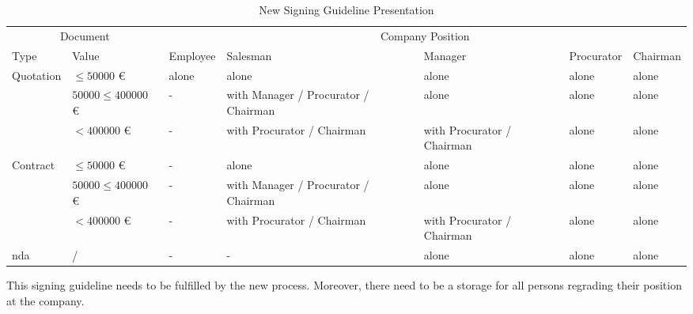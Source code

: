 \begin{table}[h!]
	\begin{tabular}{|p{1.5cm}|p{2cm}|p{2cm}|p{2cm}|p{2cm}|p{2cm}|p{2cm}|} \hline
		\multicolumn{2}{|c|}{Document} & \multicolumn{5}{c|}{Company Position}\\ 
		Type & Value & Employee & Salesman & Manager & Procurator & Chairman \\ \hline
		\multirow{3}{1.5cm}{Quotation} & $ \leq 50 000 $ \euro & alone & alone & alone & alone & alone \\ \cline{2-7}
							 & $ 50 000 \leq 400 000 $ \euro & - & with Manager / Procurator / Chairman & alone & alone & alone \\ \cline{2-7}
							 & $ < 400 000 $ \euro & - & with Procurator / Chairman & with Procurator / Chairman & alone & alone \\ \hline
		\multirow{3}{1.5cm}{Contract} & $ \leq 50 000 $ \euro & - & alone & alone & alone & alone \\ \cline{2-7}
									& $ 50 000 \leq 400 000 $ \euro & - & with Manager / Procurator / Chairman & alone & alone & alone \\ \cline{2-7}
									& $ < 400 000 $ \euro & - & with Procurator / Chairman
									& with Procurator / Chairman & alone & alone \\ \hline
		\Gls{nda} & / & - & - & alone & alone & alone \\ \hline
	\end{tabular}
	\centering
	\caption{New Signing Guideline Presentation}
	\label{tab:newSigningGuideline}
\end{table}

This signing guideline needs to be fulfilled by the new process. Moreover, there need to be a storage for all persons regrading their position at the company. 
